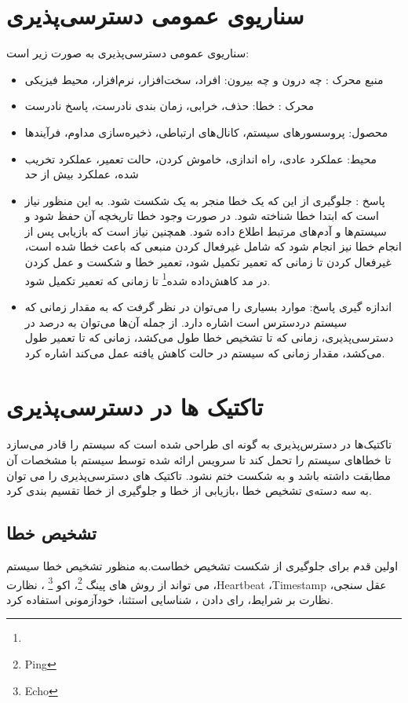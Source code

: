 \section{سناریوی عمومی دسترسی‌پذیری}
سناریو‌ی عمومی دسترسی‌پذیری به صورت زیر است:
\begin{itemize}
\item
منبع محرک : چه درون و چه بیرون: افراد، سخت‌افزار، نرم‌افزار، محیط فیزیکی 
\item
محرک : خطا: حذف، خرابی، زمان بندی نادرست، پاسخ نادرست
\item
محصول: پروسسورهای سیستم، کانال‌های ارتباطی، ذخیره‌سازی مداوم، فرآیند‌ها
\item
محیط: عملکرد عادی، راه اندازی، خاموش کردن، حالت تعمیر، عملکرد تخریب شده، عملکرد بیش از حد
\item
پاسخ : جلوگیری از این که یک خطا منجر به یک شکست شود. به این منظور نیاز است که ابتدا خطا شناخته شود. در صورت وجود خطا تاریخچه آن حفظ شود و سیستم‌ها و آدم‌های مرتبط اطلاع داده شود. همچنین نیاز است که بازیابی پس از انجام خطا نیز انجام شود که شامل غیرفعال کردن منبعی که باعث خطا شده است، غیرفعال کردن تا زمانی که تعمیر تکمیل شود، تعمیر خطا و شکست و عمل کردن در مد کاهش‌داده شده\footnote{} تا زمانی که تعمیر تکمیل شود.
\item
اندازه گیری پاسخ: موارد بسیاری را می‌توان در نظر گرفت که به مقدار زمانی که سیستم دردسترس است اشاره دارد. از جمله آن‌ها می‌توان به درصد در دسترسی‌پذیری، زمانی که تا تشخیص خطا طول می‌کشد، زمانی که تا تعمیر طول ‌می‌کشد، مقدار زمانی که سیستم در حالت کاهش یافته عمل می‌کند اشاره کرد. 
\end{itemize}

\section{تاکتیک ها در دسترسی‌پذیری}
تاکتیک‌ها در دسترس‌پذیری به گونه ای طراحی شده است که سیستم را قادر می‌سازد تا خطاهای سیستم را تحمل کند تا سرویس ارائه شده توسط سیستم با مشخصات آن مطابقت داشته باشد و به شکست ختم نشود. تاکتیک های دسترسی‌پذیری را می توان به سه دسته‌ی تشخیص خطا ،بازیابی از خطا و جلوگیری از خطا تقسیم بندی کرد.
\subsection{تشخیص خطا}
اولین قدم برای جلوگیری از شکست تشخیص خطاست.به منظور تشخیص خطا سیستم می تواند از روش های
پینگ \footnote{Ping}، اکو \footnote{Echo} ،
نظارت
،Heartbeat
،Timestamp
عقل سنجی،
نظارت بر شرایط،
رای دادن ،
شناسایی استثنا،
خودآزمونی 
استفاده کرد.
